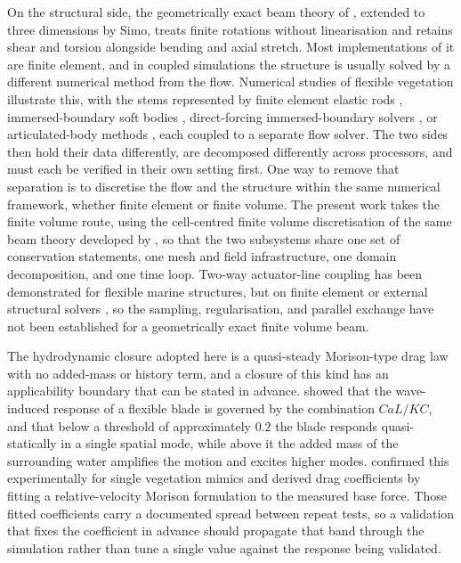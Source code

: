\noindent
On the structural side, the geometrically exact beam theory of \citet{reissner_finite_1981}, extended to three dimensions by Simo, treats finite rotations without linearisation and retains shear and torsion alongside bending and axial stretch. Most implementations of it are finite element, and in coupled simulations the structure is usually solved by a different numerical method from the flow. Numerical studies of flexible vegetation illustrate this, with the stems represented by finite element elastic rods \citep{chen_eulerianlagrangian_2019,elrahi_numerical_2023}, immersed-boundary soft bodies \citep{kim_steady_2024}, direct-forcing immersed-boundary solvers \citep{pruter_comprehensive_2025}, or articulated-body methods \citep{dickinson_modelling_2025}, each coupled to a separate flow solver. The two sides then hold their data differently, are decomposed differently across processors, and must each be verified in their own setting first. One way to remove that separation is to discretise the flow and the structure within the same numerical framework, whether finite element or finite volume. The present work takes the finite volume route, using the cell-centred finite volume discretisation of the same beam theory developed by \citet{bali_cell-centered_2022,bali_finite_2024,bali_beamfoam_2025}, so that the two subsystems share one set of conservation statements, one mesh and field infrastructure, one domain decomposition, and one time loop. Two-way actuator-line coupling has been demonstrated for flexible marine structures, but on finite element or external structural solvers \citep{schmitt_coupled_2022,bral_modeling_2025}, so the sampling, regularisation, and parallel exchange have not been established for a geometrically exact finite volume beam.

\noindent
The hydrodynamic closure adopted here is a quasi-steady Morison-type drag law with no added-mass or history term, and a closure of this kind has an applicability boundary that can be stated in advance. \citet{leclercq_reconfiguration_2018} showed that the wave-induced response of a flexible blade is governed by the combination $CaL/KC$, and that below a threshold of approximately $0.2$ the blade responds quasi-statically in a single spatial mode, while above it the added mass of the surrounding water amplifies the motion and excites higher modes. \citet{jacobsen_waveinduced_2019} confirmed this experimentally for single vegetation mimics and derived drag coefficients by fitting a relative-velocity Morison formulation to the measured base force. Those fitted coefficients carry a documented spread between repeat tests, so a validation that fixes the coefficient in advance should propagate that band through the simulation rather than tune a single value against the response being validated.

